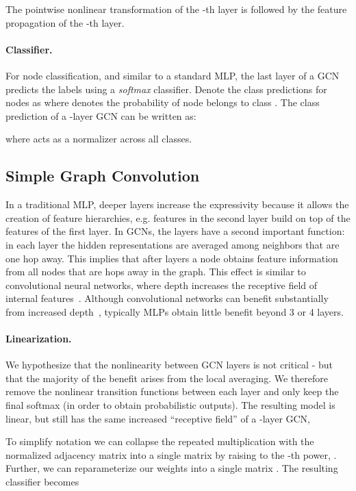 \documentclass{article}
\begin{document}
The pointwise nonlinear transformation of the -th layer is followed by the feature propagation of the -th layer.
\paragraph{Classifier.} For node classification, and similar to a standard MLP, the last layer of a GCN predicts the labels using a \textit{softmax} classifier. Denote the class predictions for  nodes as  where 
 denotes the probability of node  belongs to class .
The class prediction  of a -layer GCN can be written as:

where  acts as a normalizer across all classes. 

\subsection{Simple Graph Convolution}
In a traditional MLP, deeper layers increase the expressivity because it allows the creation of feature hierarchies, e.g. features in the second layer build on top of the features of the first layer. In GCNs, the layers have a second important function: in each layer the hidden representations are averaged among neighbors that are one hop away. This implies that after  layers a node obtains feature information from all nodes that are hops away in the graph. This effect is similar to convolutional neural networks, where depth increases the receptive field of internal features~\cite{hariharan2015hypercolumns}.  Although convolutional networks can benefit substantially from increased depth~\cite{huang2016deep}, typically MLPs obtain little benefit beyond 3 or 4 layers. 

\paragraph{Linearization.}
We hypothesize that the nonlinearity between GCN layers is not critical - but that the majority of the benefit arises from the local averaging. We therefore remove the nonlinear transition functions between each layer and only keep the final softmax (in order to obtain probabilistic outputs). 
The resulting model is linear, but still has the same increased ``receptive field'' of a -layer GCN,

To simplify notation we can collapse the repeated multiplication with the normalized adjacency matrix  into a single matrix by raising  to the -th power, . Further, we can reparameterize our weights into a single matrix  .  The resulting classifier becomes
\end{document}
